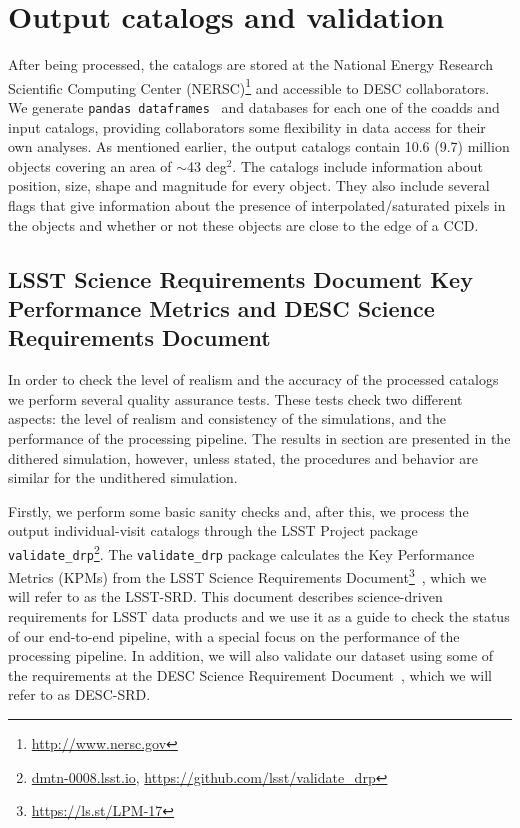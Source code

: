 \documentclass[twocolumn]{aastex62}
\begin{document}
\section{Output catalogs and validation}
\label{sec:catalogs}
After being processed, the catalogs are stored at the National Energy Research Scientific Computing Center (NERSC)\footnote{\url{http://www.nersc.gov}} and accessible to DESC collaborators. We generate \texttt{pandas
dataframes}~\citep{mckinney-proc-scipy-2010} and databases for each one of the coadds and input catalogs, providing collaborators some flexibility in data access for their own analyses. As mentioned earlier, the output catalogs contain 10.6 (9.7) million objects covering an area
of $\sim$43 deg$^{2}$. The catalogs include information about position, size, shape and magnitude for every object. They also include several flags that give information about the presence of interpolated/saturated pixels in the objects and whether or not these objects are close to the edge of a CCD.

\subsection{LSST Science Requirements Document Key Performance Metrics and DESC Science Requirements Document}

In order to check the level of realism and the accuracy of the processed catalogs we perform several quality assurance tests. These tests check two different aspects: the level of realism and consistency of the simulations, and the performance of the processing pipeline. The results in section are presented in the dithered simulation, however, unless stated, the procedures and behavior are similar for the undithered simulation.

Firstly, we perform some basic sanity checks and, after this, we process the output individual-visit catalogs through the LSST Project package \texttt{validate\_drp}\footnote{\url{dmtn-0008.lsst.io}, \url{https://github.com/lsst/validate_drp}}.
The \texttt{validate\_drp} package calculates the Key Performance Metrics (KPMs) from the LSST Science Requirements Document\footnote{\url{https://ls.st/LPM-17}}~\citep{LPM-17}, which we will refer to as the LSST-SRD. This document describes science-driven requirements for LSST data products and we use it as a guide to check the status of our end-to-end pipeline, with a special focus on the performance of the processing pipeline. In addition, we will also validate our dataset using some of the requirements at the DESC Science Requirement Document~\citep[][DESC-SRD;]{2018arXiv180901669T}, which we will refer to as DESC-SRD.
 
\end{document}
